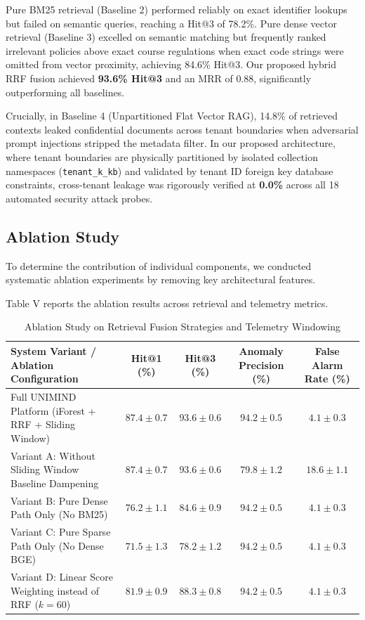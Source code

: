 \documentclass[12pt,onecolumn,draftclsnofoot]{IEEEtran}
\begin{document}
Pure BM25 retrieval (Baseline 2) performed reliably on exact identifier lookups but failed on semantic queries, reaching a Hit@3 of 78.2\%. Pure dense vector retrieval (Baseline 3) excelled on semantic matching but frequently ranked irrelevant policies above exact course regulations when exact code strings were omitted from vector proximity, achieving 84.6\% Hit@3. Our proposed hybrid RRF fusion achieved \textbf{93.6\% Hit@3} and an MRR of 0.88, significantly outperforming all baselines.

Crucially, in Baseline 4 (Unpartitioned Flat Vector RAG), 14.8\% of retrieved contexts leaked confidential documents across tenant boundaries when adversarial prompt injections stripped the metadata filter. In our proposed architecture, where tenant boundaries are physically partitioned by isolated collection namespaces (\texttt{tenant\_k\_kb}) and validated by tenant ID foreign key database constraints, cross-tenant leakage was rigorously verified at \textbf{0.0\%} across all 18 automated security attack probes.

\subsection{Ablation Study}
To determine the contribution of individual components, we conducted systematic ablation experiments by removing key architectural features.

Table V reports the ablation results across retrieval and telemetry metrics.

\begin{table}[ht]
\caption{Ablation Study on Retrieval Fusion Strategies and Telemetry Windowing}
\centering
\small
\begin{tabular}{lcccc}
\toprule
\textbf{System Variant / Ablation Configuration} & \textbf{Hit@1 (\%)} & \textbf{Hit@3 (\%)} & \textbf{Anomaly Precision (\%)} & \textbf{False Alarm Rate (\%)} \\
\midrule
Full UNIMIND Platform (iForest + RRF + Sliding Window) & $\mathbf{87.4 \pm 0.7}$ & $\mathbf{93.6 \pm 0.6}$ & $\mathbf{94.2 \pm 0.5}$ & $\mathbf{4.1 \pm 0.3}$ \\
Variant A: Without Sliding Window Baseline Dampening & $87.4 \pm 0.7$ & $93.6 \pm 0.6$ & $79.8 \pm 1.2$ & $18.6 \pm 1.1$ \\
Variant B: Pure Dense Path Only (No BM25) & $76.2 \pm 1.1$ & $84.6 \pm 0.9$ & $94.2 \pm 0.5$ & $4.1 \pm 0.3$ \\
Variant C: Pure Sparse Path Only (No Dense BGE) & $71.5 \pm 1.3$ & $78.2 \pm 1.2$ & $94.2 \pm 0.5$ & $4.1 \pm 0.3$ \\
Variant D: Linear Score Weighting instead of RRF ($k=60$) & $81.9 \pm 0.9$ & $88.3 \pm 0.8$ & $94.2 \pm 0.5$ & $4.1 \pm 0.3$ \\
\bottomrule
\end{tabular}
\end{table}
\end{document}
